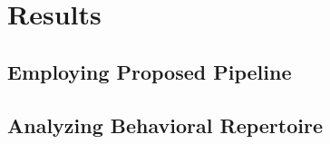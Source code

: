 \chapter{Results}

\section{Employing Proposed Pipeline}\label{section:employing-proposed-pipeline}

\section{Analyzing Behavioral Repertoire}
